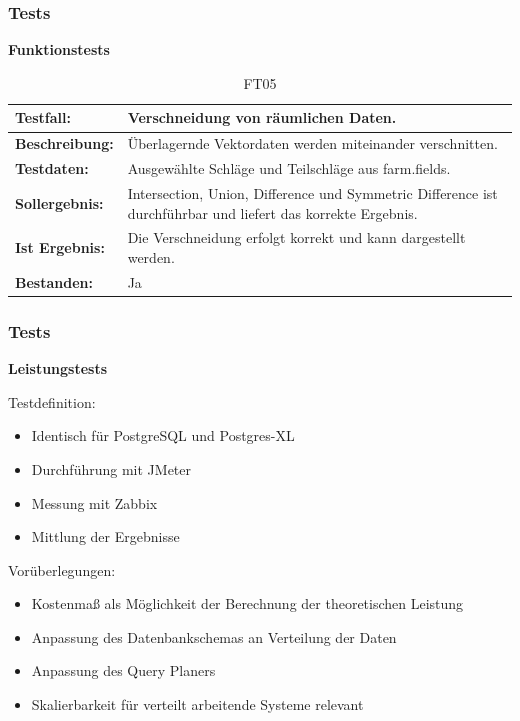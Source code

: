 \documentclass{beamer}
\begin{document}
\begin{frame}\frametitle{Tests}
\centering\textbf{Funktionstests}

\begin{table}[h!]
\centering
\small
\begin{tabular}{|p{2.3cm}|p{7cm}|}
 \hline
\textbf{Testfall:} & Verschneidung von räumlichen Daten. \\ \hline
\textbf{Beschreibung:} & Überlagernde Vektordaten werden miteinander verschnitten. \\ \hline
\textbf{Testdaten:} & Ausgewählte Schläge und Teilschläge aus farm.fields. \\ \hline
\textbf{Sollergebnis:} & Intersection, Union, Difference und Symmetric Difference ist durchführbar und liefert das korrekte Ergebnis. \\ \hline
\textbf{Ist Ergebnis:} & Die Verschneidung erfolgt korrekt und kann dargestellt werden. \\ \hline
\textbf{Bestanden:} & Ja \\ \hline
\end{tabular}
\caption{FT05}
\end{table}
\end{frame}

\begin{frame}\frametitle{Tests}
\centering\textbf{Leistungstests}

\begin{block}{Testdefinition:}
\begin{itemize}
\item Identisch für PostgreSQL und Postgres-XL
\item Durchführung mit JMeter
\item Messung mit Zabbix
\item Mittlung der Ergebnisse %
\end{itemize}
\end{block}

\begin{block}{Vorüberlegungen:}
\begin{itemize}
\item Kostenmaß als Möglichkeit der Berechnung der theoretischen Leistung
\item Anpassung des Datenbankschemas an Verteilung der Daten
\item Anpassung des Query Planers
\item Skalierbarkeit für verteilt arbeitende Systeme relevant
\end{itemize}
\end{block}
\end{frame}
\end{document}
